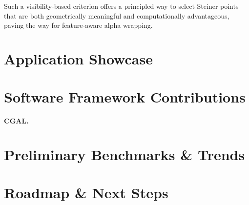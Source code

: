 Such a visibility-based criterion offers a principled way to select Steiner points that are both geometrically meaningful and computationally advantageous, paving the way for feature-aware alpha wrapping.











\section{Application Showcase}
%   

\section{Software Framework Contributions}

\paragraph{CGAL.}



\section{Preliminary Benchmarks \& Trends}

\section{Roadmap \& Next Steps}

